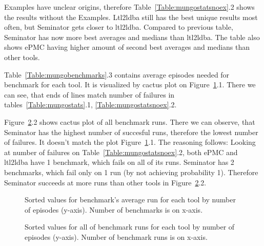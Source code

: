 \documentclass[
	digital,
nolof, nolot
]{fithesis3}
\begin{document}
	Examples have unclear origins, therefore Table~\ref{Table:mungostatsnoex}.2 shows the results without the Examples. Ltl2ldba still has the best unique results most often, but Seminator gets closer to ltl2ldba. Compared to previous table, Seminator has now more best averages and medians than ltl2ldba. The table also shows ePMC having higher amount of second best averages and medians than other tools. 
	
	Table~\ref{Table:mungobenchmarks}.3 contains average episodes needed for benchmark for each tool. It is visualized by cactus plot on Figure~\ref{Cactus:mungoaverage}.1. There we can see, that ends of lines match number of failures in tables~\ref{Table:mungostats}.1, \ref{Table:mungostatsnoex}.2.
	
	Figure~\ref{Cactus:mungoruns}.2 shows cactus plot of all benchmark runs. There we can observe, that Seminator has the highest number of succesful runs, therefore the lowest number of failures. It doesn't match the plot Figure~\ref{Cactus:mungoaverage}.1. The reasoning follows: Looking at number of failures on Table~\ref{Table:mungostatsnoex}.2, both ePMC and ltl2ldba have 1 benchmark, which fails on all of its runs. Seminator has 2 benchmarks, which fail only on 1 run (by not achieving probability 1). Therefore Seminator succeeds at more runs than other tools in Figure~\ref{Cactus:mungoruns}.2.
	
	
	
	\begin{table}[ht]
		\centering
		\label{Table:mungostats}
		\caption{Results with Examples included}
		
	\end{table}
	
	\begin{table}[ht]
		\centering
		\label{Table:mungostatsnoex}
		\caption{Results with Examples excluded }
		
	\end{table}
	
	\begin{table}[ht]
		\centering
		\label{Table:mungobenchmarks}
		\caption{Table of average episodes needed to reach probability 1.}
		
	\end{table}
	
	\begin{figure}[ht]
		\centering
		\label{Cactus:mungoaverage}
		\caption{Sorted values for benchmark's average run for each tool by number of episodes (y-axis). Number of benchmarks is on x-axis. }
		
	\end{figure}
	\begin{figure}
		\centering
		\label{Cactus:mungoruns}
		\caption{Sorted values for all of benchmark runs for each tool by number of episodes (y-axis). Number of benchmark runs is on x-axis. }
	
	\end{figure}
	
\end{document}

